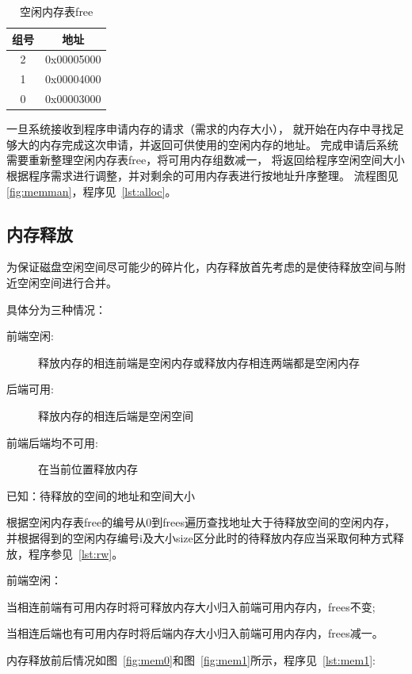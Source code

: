 \begin{table}[h]
  \centering
  \begin{tabular}{|c|c|}
    \hline 组号 & 地址 \\
    \hline 2 & 0x00005000 \\ 
    \hline 1 & 0x00004000 \\
    \hline 0 & 0x00003000 \\
    \hline
  \end{tabular}
  \caption{空闲内存表free}
  \label{tab:free}
\end{table}

一旦系统接收到程序申请内存的请求（需求的内存大小），
就开始在内存中寻找足够大的内存完成这次申请，并返回可供使用的空闲内存的地址。
完成申请后系统需要重新整理空闲内存表free，将可用内存组数减一，
将返回给程序空闲空间大小根据程序需求进行调整，并对剩余的可用内存表进行按地址升序整理。
流程图见\ref{fig:memman}，程序见~\ref{lst:alloc}。


\subsection{内存释放}

为保证磁盘空闲空间尽可能少的碎片化，内存释放首先考虑的是使待释放空间与附近空闲空间进行合并。

具体分为三种情况：

\begin{description}
\item[前端空闲:]释放内存的相连前端是空闲内存或释放内存相连两端都是空闲内存
\item[后端可用:]释放内存的相连后端是空闲空间
\item[前端后端均不可用:]在当前位置释放内存
\end{description}

已知：待释放的空间的地址和空间大小

根据空闲内存表free的编号从0到frees遍历查找地址大于待释放空间的空闲内存，
并根据得到的空闲内存编号i及大小size区分此时的待释放内存应当采取何种方式释放，程序参见~\ref{lst:rw}。

前端空闲：

当相连前端有可用内存时将可释放内存大小归入前端可用内存内，frees不变;

当相连后端也有可用内存时将后端内存大小归入前端可用内存内，frees减一。

内存释放前后情况如图~\ref{fig:mem0}和图~\ref{fig:mem1}所示，程序见~\ref{lst:mem1}: 

